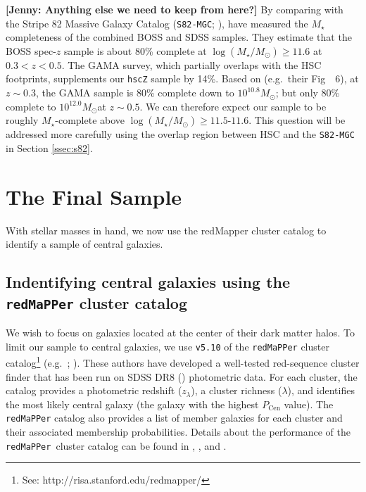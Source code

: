 \documentclass[a4paper,fleqn,usenatbib]{mnras}
\def\msun{$M_\odot$}
\def\redm{\texttt{redMaPPer}}
\def\mstar{{$M_{\star}$}}
\def\logms{{$\log (M_{\star}/M_{\odot})$}}
\newcommand{\jenny}[1]{\textcolor{Bittersweet}{\textbf{[Jenny: #1]}}}
\begin{document}
	\jenny{Anything else we need to keep from here?}
	By comparing with the Stripe 82 Massive Galaxy Catalog
    (\texttt{S82-MGC}; \citealt{Bundy2015}), \citet{Leauthaud2016} have measured the
    \mstar{} completeness of the combined BOSS and SDSS samples. 
    They estimate that the BOSS spec-$z$ sample is about 80\% complete at 
    \logms{}$\geq 11.6$ at $0.3 < z < 0.5$. 
    The GAMA survey, which partially overlaps with the HSC footprints, supplements 
    our \texttt{hscZ} sample by 14\%. 
    Based on \citet{Taylor2011} (e.g.\ their Fig~~6), at $z{\sim} 0.3$, the GAMA 
    sample is 80\% complete down to $10^{10.8}$\msun; but only 80\% complete to 
    $10^{12.0}$\msun at $z{\sim} 0.5$. 
    We can therefore expect our sample to be roughly \mstar{}-complete above 
    \logms{}$\geq 11.5$-$11.6$. 
    This question will be addressed more carefully using the overlap region between 
    HSC and the \texttt{S82-MGC} in Section \ref{ssec:s82}.

\section{The Final Sample}
    \label{sec:final}
    
	With stellar masses in hand, we now use the redMapper cluster catalog to identify a sample of 
    central galaxies.

	\subsection{Indentifying central galaxies using the \redm{}{} cluster catalog}
    \label{ssec:redmapper}
    
    We wish to focus on galaxies located at the center of their dark matter halos. 
    To limit our sample to central galaxies, we use \texttt{v5.10} of the \redm{}{} 
    cluster catalog\footnote{See: http://risa.stanford.edu/redmapper/} 
    (e.g.\ \citealt{Rykoff2014}; \citealt{Rozo2015b}). 
    These authors have developed a well-tested red-sequence cluster finder that has 
    been run on SDSS DR8 (\citealt{SDSSDR8}) photometric data. 
    For each cluster, the catalog provides a photometric redshift ($z_{\lambda}$), a 
    cluster richness ($\lambda$), and identifies the most likely central galaxy (the 
    galaxy with the highest $P_{\mathrm{Cen}}$ value). 
    The \redm{}{} catalog also provides a list of member galaxies for each cluster and 
    their associated membership probabilities. 
    Details about the performance of the \redm{}~cluster catalog can be found in 
    \citet{Rozo2014}, \citet{Rozo2015a}, and \citet{Rozo2015b}. 
    
\end{document}
